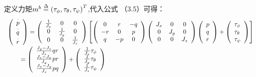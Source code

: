 定义力矩${m^b} \buildrel \Delta \over = {\left( {{\tau _\phi },{\tau _\theta },{\tau _\psi }} \right)^T}$,代入公式
（3.5）可得：
\[\begin{array}{l}
\left( \begin{array}{l}
\mathop p\limits^ \cdot  \\
\mathop q\limits^ \cdot  \\
\mathop r\limits^ \cdot
\end{array} \right) = \left( {\begin{array}{*{20}{c}}
{\frac{1}{{{J_x}}}}&0&0\\
0&{\frac{1}{{{J_y}}}}&0\\
0&0&{\frac{1}{{{J_z}}}}
\end{array}} \right)\left[ {\left( {\begin{array}{*{20}{c}}
0&r&{ - q}\\
{ - r}&0&p\\
q&{ - p}&0
\end{array}} \right)\left( {\begin{array}{*{20}{c}}
{{J_x}}&0&0\\
0&{{J_y}}&0\\
0&0&{{J_z}}
\end{array}} \right)\left( \begin{array}{l}
p\\
q\\
r
\end{array} \right) + \left( \begin{array}{l}
{\tau _\phi }\\
{\tau _\theta }\\
{\tau _\psi }
\end{array} \right)} \right]\\
{\kern 1pt} {\kern 1pt} {\kern 1pt} {\kern 1pt} {\kern 1pt} {\kern 1pt} {\kern 1pt} {\kern 1pt} {\kern 1pt} {\kern 1pt} {\kern 1pt} {\kern 1pt} {\kern 1pt} {\kern 1pt} {\kern 1pt} {\kern 1pt} {\kern 1pt} {\kern 1pt}  = \left( \begin{array}{l}
\frac{{{J_y} - {J_z}}}{{{J_x}}}qr\\
\frac{{{J_z} - {J_x}}}{{{J_y}}}pr\\
\frac{{{J_x} - {J_y}}}{{{J_z}}}pq
\end{array} \right) + \left( \begin{array}{l}
\frac{1}{{{J_x}}}{\tau _\phi }\\
\frac{1}{{{J_y}}}{\tau _\theta }\\
\frac{1}{{{J_z}}}{\tau _\psi }
\end{array} \right)\\
{\kern 1pt} {\kern 1pt} {\kern 1pt} {\kern 1pt} {\kern 1pt} {\kern 1pt} {\kern 1pt}
\end{array}\]

